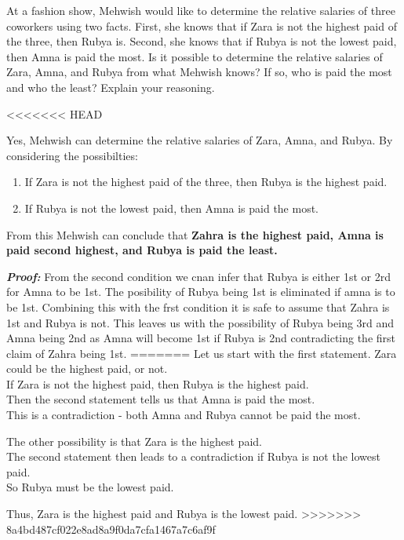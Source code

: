\documentclass[a4paper]{exam}
\begin{document}
\begin{questions}
  \question At a fashion show, Mehwish would like to determine the relative salaries of three coworkers using two facts. First, she knows that if Zara is not the highest paid of the three, then Rubya is. Second, she knows that if Rubya is not the lowest paid, then Amna is paid the most. Is it possible to determine the relative salaries of Zara, Amna, and Rubya from what Mehwish knows? If so, who is paid the most and who the least? Explain your reasoning.
  \begin{solution}
<<<<<<< HEAD
    
    Yes, Mehwish can determine the relative salaries of Zara, Amna, and Rubya. By considering the possibilties:
    \begin{enumerate}
      \item If Zara is not the highest paid of the three, then Rubya is the highest paid. 
      \item If Rubya is not the lowest paid, then Amna is paid the most.
    \end{enumerate}
    From this Mehwish can conclude that \textbf{Zahra is the highest paid, Amna is paid second highest, and Rubya is paid the least.}

    \textbf{\textit{Proof:}} From the second condition we cnan infer that Rubya is either 1st or 2rd for Amna to be 1st. The posibility of Rubya being 1st is eliminated if amna is to be 1st.
    Combining this with the frst condition it is safe to assume that Zahra is 1st and Rubya is not. This leaves us with the possibility of Rubya being 3rd and Amna being 2nd as Amna will become 1st if Rubya is 2nd contradicting the first claim of Zahra being 1st.
=======
    Let us start with the first statement. Zara could be the highest paid, or not.\\
    If Zara is not the highest paid, then Rubya is the highest paid.\\
    Then the second statement tells us that Amna is paid the most.\\
    This is a contradiction - both Amna and Rubya cannot be paid the most.

    The other possibility is that Zara is the highest paid.\\
    The second statement then leads to a contradiction if Rubya is not the lowest paid.\\
    So Rubya must be the lowest paid.

    Thus, Zara is the highest paid and Rubya is the lowest paid.
>>>>>>> 8a4bd487cf022e8ad8a9f0da7cfa1467a7c6af9f
  \end{solution}
\end{questions}
\end{document}

